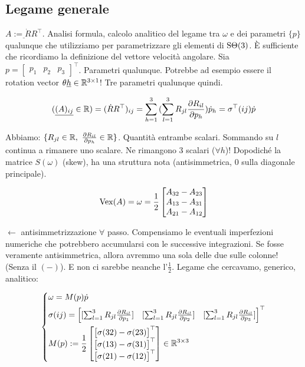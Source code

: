 \subsection{Legame generale}

$\underline{A := \dot{R}R^\top}$. Analisi formula, calcolo analitico del legame tra $\omega$ e dei parametri $\{p\}$ qualunque che utilizziamo per parametrizzare gli elementi di $\operatorname{S\Theta}(3)$. \`E sufficiente che ricordiamo la definizione del vettore velocità angolare. Sia $p=\begin{bmatrix}p_1&p_2&p_3\end{bmatrix}^\top$. Parametri qualunque. Potrebbe ad esempio essere il rotation vector $\theta\underline{h}\in\mathbb{R}^{3\times 1}$! Tre parametri qualunque quindi.

\[
	(\underline{(A)_{ij}}\in\mathbb{R}) = (\dot{R}R^\top)_{ij} = \sum_{h=1}^3{(\sum_{l=1}^3{R_{jl}\frac{\partial R_{il}}{\partial p_h}})\dot{p}_h} = \sigma^\top(ij)\dot{p}
\]

Abbiamo: $\{R_{jl}\in\mathbb{R},\ \frac{\partial R_{il}}{\partial p_h}\in\mathbb{R}\}$. Quantità entrambe scalari. Sommando su $l$ continua a rimanere uno scalare. Ne rimangono 3 scalari ($\forall h$)! Dopodiché la matrice $S(\omega)$ (skew), ha una struttura nota (antisimmetrica, 0 sulla diagonale principale).

\[
	\operatorname{Vex}(A) = \omega = \frac{1}{2}\begin{bmatrix}A_{32}-A_{23}\\A_{13}-A_{31}\\A_{21}-A_{12}\end{bmatrix}
\]

$\leftarrow$ antisimmetrizzazione $\forall$ passo. Compensiamo le eventuali imperfezioni numeriche che potrebbero accumularsi con le successive integrazioni. Se fosse veramente antisimmetrica, allora avremmo una sola delle due sulle colonne! (Senza il $(-)$). E non ci sarebbe neanche l'$\frac{1}{2}$. Legame che cercavamo, generico, analitico:

\[
	\left\{
	\begin{aligned}
	&\omega=M(p)\dot{p}\\
	&\sigma(ij) = \begin{bmatrix}[\sum_{l=1}^3{R_{jl}\frac{\partial R_{il}}{\partial p_1}}]&[\sum_{l=1}^3{R_{jl}\frac{\partial R_{il}}{\partial p_2}}]&[\sum_{l=1}^3{R_{jl}\frac{\partial R_{il}}{\partial p_3}}]\end{bmatrix}^\top\\
	&M(p) := \frac{1}{2}\begin{bmatrix}\begin{bmatrix}\sigma(32)-\sigma(23)\end{bmatrix}^\top\\\begin{bmatrix}\sigma(13)-\sigma(31)\end{bmatrix}^\top\\\begin{bmatrix}\sigma(21)-\sigma(12)\end{bmatrix}^\top\end{bmatrix}\in\mathbb{R}^{3\times 3}
	\end{aligned}
	\right.
\]

